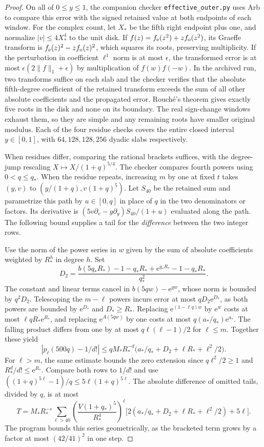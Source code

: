 \documentclass[11pt]{article}
\newcommand{\ee}{\mathrm e}
\begin{document}
\begin{proof}
On all of \(0\le y\le1\), the companion checker \texttt{effective\_outer.py} uses Arb to compare this error with the signed retained value at both endpoints of each window. For the complex count, let \(X_*\) be the fifth right endpoint plus one, and normalize \(|v|\le4X_*^4\) to the unit disk. If \(f(z)=f_{\rm e}(z^2)+z f_{\rm o}(z^2)\), its Graeffe transform is \(f_{\rm e}(z)^2-z f_{\rm o}(z)^2\), which squares its roots, preserving multiplicity. If the perturbation in coefficient \(\ell^1\) norm is at most \(\epsilon\), the transformed error is at most \(\epsilon(2\|f\|_1+\epsilon)\) by multiplication of \(f(w)f(-w)\). In the archived run, two transforms suffice on each slab and the checker verifies that the absolute fifth-degree coefficient of the retained transform exceeds the sum of all other absolute coefficients and the propagated error. Rouché's theorem gives exactly five roots in the disk and none on its boundary. The real sign-change windows exhaust them, so they are simple and any remaining roots have smaller original modulus. Each of the four residue checks covers the entire closed interval \(y\in[0,1]\), with \(64,128,128,256\) dyadic slabs respectively.

When residues differ, comparing the rational brackets suffices, with the degree-jump rescaling \(X\mapsto X/(1+q)^{5/4}\). The checker compares fourth powers using \(0<q\le q_*\). When the residue repeats, increasing \(m\) by one at fixed \(t\) takes \((y,v)\) to \((y/(1+q),v(1+q)^5)\). Let \(S_{40}\) be the retained sum and parametrize this path by \(u\in[0,q]\) in place of \(q\) in the two denominators or factors. Its derivative is \((5v\partial_v-y\partial_y)S_{40}/(1+u)\) evaluated along the path. The following bound supplies a tail for the \emph{difference} between the two integer rows.

Use the norm of the power series in \(w\) given by the sum of absolute coefficients weighted by \(R_*^h\) in degree \(h\). Set
\[
 D_2=\frac{b(5q_*R_*)-1-q_*R_*+\ee^{q_*R_*}-1-q_*R_*}{q_*^2}.
\]
The constant and linear terms cancel in \(b(5qw)-\ee^{qw}\), whose norm is bounded by \(q^2D_2\). Telescoping the \(m-\ell\) powers incurs error at most \(qD_2\ee^{D_*}\), as both powers are bounded by \(\ee^{D_*}\) and \(D_*\ge R_*\). Replacing \(\ee^{(1-\ell q)w}\) by \(\ee^w\) costs at most \(\ell q R_*\ee^{R_*}\), and replacing \(\ee^{A(5qw)}\) by one costs at most \(q(a_*/q_*)\ee^{a_*}\). The falling product differs from one by at most \(q\ell(\ell-1)/2\) for \(\ell\le m\). Together these yield
\[
 |p_\ell(500q)-1/d!|
 \le q M_*R_*^{-d}\bigl(a_*/q_*+D_2+\ell R_*+\ell^2/2\bigr).
\]
For \(\ell>m\), the same estimate bounds the zero extension since \(q\ell^2/2\ge1\) and \(R_*^d/d!\le\ee^{R_*}\). Compare both rows to \(1/d!\) and use \(((1+q)^{5\ell}-1)/q\le5\ell(1+q)^{5\ell}\). The absolute difference of omitted tails, divided by \(q\), is at most
\[
 T=M_*R_*^{-s}\sum_{\ell>40}
 \left(\frac{V(1+q_*)^5}{R_*^4}\right)^\ell
 \bigl[2(a_*/q_*+D_2+\ell R_*+\ell^2/2)+5\ell\bigr].
\]
The program bounds this series geometrically, as the bracketed term grows by a factor at most \((42/41)^2\) in one step.


\end{proof}
\end{document}
